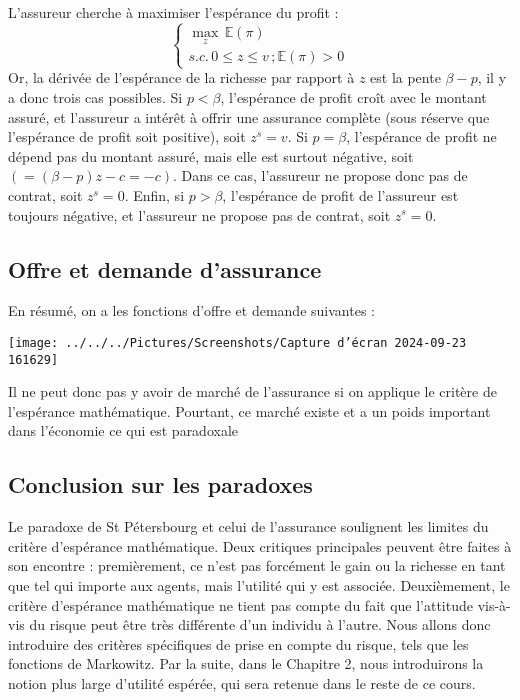 \documentclass[a4paper, 12pt]{report}
\begin{document}
L'assureur cherche à maximiser l'espérance du profit :
$$
\begin{cases}\underset{z}\max \,\mathbb{E}(\pi)\\ s.c. \, 0\le z\le v\,;\mathbb{E}(\pi)>0\end{cases}
$$
Or, la dérivée de l'espérance de la richesse par rapport à \( z \) est la pente \( \beta - p \), il y a donc trois cas possibles. Si \( p < \beta \), l'espérance de profit croît avec le montant assuré, et l'assureur a intérêt à offrir une assurance complète (sous réserve que l'espérance de profit soit positive), soit \( z^s = v \). Si \( p = \beta \), l'espérance de profit ne dépend pas du montant assuré, mais elle est surtout négative, soit $ (=(\beta-p) z - c = -c)$. Dans ce cas, l'assureur ne propose donc pas de contrat, soit \( z^s = 0 \). Enfin, si \( p > \beta \), l'espérance de profit de l'assureur est toujours négative, et l'assureur ne propose pas de contrat, soit \( z^s = 0 \).

\subsection{Offre et demande d'assurance}
En résumé, on a les fonctions d'offre et demande suivantes :
\begin{center}
\texttt{[image: ../../../Pictures/Screenshots/Capture d'écran 2024-09-23 161629]}
\end{center}
Il ne peut donc pas y avoir de marché de l'assurance si on applique le critère de l'espérance mathématique. Pourtant, ce marché existe et a un poids important dans l'économie ce qui est paradoxale

\subsection{Conclusion sur les paradoxes}

Le paradoxe de St Pétersbourg et celui de l'assurance soulignent les limites du critère d'espérance mathématique. Deux critiques principales peuvent être faites à son encontre : premièrement, ce n'est pas forcément le gain ou la richesse en tant que tel qui importe aux agents, mais l'utilité qui y est associée. Deuxièmement, le critère d'espérance mathématique ne tient pas compte du fait que l'attitude vis-à-vis du risque peut être très différente d'un individu à l'autre. Nous allons donc introduire des critères spécifiques de prise en compte du risque, tels que les fonctions de Markowitz. Par la suite, dans le Chapitre 2, nous introduirons la notion plus large d'utilité espérée, qui sera retenue dans le reste de ce cours.
\end{document}
